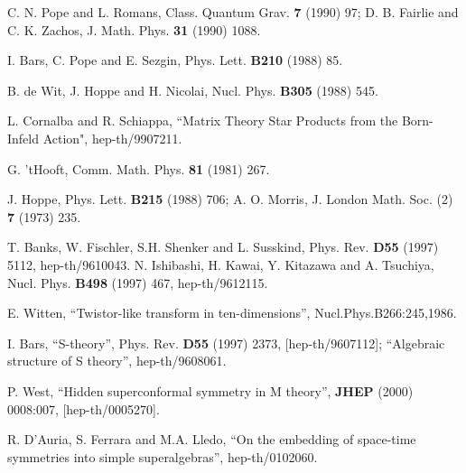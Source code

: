 \documentclass[a4paper,12pt]{article}
\begin{document}
\begin{thebibliography}{99}
  C. N. Pope and L. Romans, Class. Quantum Grav. \textbf{7}
(1990) 97; D. B. Fairlie and C. K. Zachos, J. Math. Phys. \textbf{31} (1990)
1088.

  I. Bars, C. Pope and E. Sezgin, Phys. Lett. \textbf{B210}
(1988) 85.

  B. de Wit, J. Hoppe and H. Nicolai, Nucl. Phys. \textbf{B305}
(1988) 545.

  L. Cornalba and R. Schiappa, ``Matrix Theory Star Products
from the Born-Infeld Action", hep-th/9907211.

  G. 'tHooft, Comm. Math. Phys. \textbf{81} (1981) 267.

  J. Hoppe, Phys. Lett. \textbf{B215} (1988) 706; A. O.
Morris, J. London Math. Soc. (2) \textbf{7} (1973) 235.

  T. Banks, W. Fischler, S.H. Shenker and L. Susskind, Phys.
Rev. \textbf{D55} (1997) 5112, hep-th/9610043. \newline
N. Ishibashi, H. Kawai, Y. Kitazawa and A. Tsuchiya, Nucl. Phys. \textbf{B498%
} (1997) 467, hep-th/9612115.

  E. Witten, ``Twistor-like transform in ten-dimensions'',
Nucl.Phys.B266:245,1986.

  I. Bars, ``S-theory'', Phys. Rev. \textbf{D55} (1997)
2373, [hep-th/9607112]; ``Algebraic structure of S theory'', hep-th/9608061.

  P. West, ``Hidden superconformal symmetry in M theory'', 
\textbf{JHEP} (2000) 0008:007, [hep-th/0005270].

  R. D'Auria, S. Ferrara and M.A. Lledo, ``On the embedding
of space-time symmetries into simple superalgebras'', hep-th/0102060.
\end{thebibliography}
\end{document}
